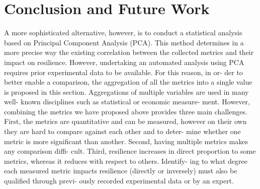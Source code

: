 \documentclass[final,5p,times,twocolumn]{elsarticle}
\begin{document}






\section{Conclusion and Future Work}



A more sophisticated alternative, however, is to conduct a statistical analysis based on Principal Component Analysis (PCA). This method determines in a more precise way the existing correlation between the collected metrics and their impact on resilience. However, undertaking an automated analysis using PCA requires prior experimental data to be available. For this reason, in or- der to better enable a comparison, the aggregation of all the metrics into a single value is proposed in this section. Aggregations of multiple variables are used in many well- known disciplines such as statistical or economic measure- ment. However, combining the metrics we have proposed above provides three main challenges. First, the metrics are quantitative and can be measured, however on their own they are hard to compare against each other and to deter- mine whether one metric is more significant than another. Second, having multiple metrics makes any comparison diffi- cult. Third, resilience increases in direct proportion to some metrics, whereas it reduces with respect to others. Identify- ing to what degree each measured metric impacts resilience (directly or inversely) must also be qualified through previ- ously recorded experimental data or by an expert.










\end{document}
